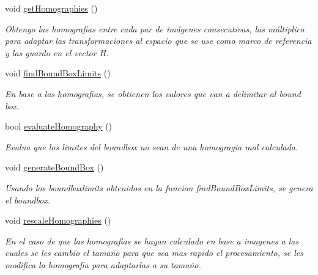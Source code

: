 \begin{DoxyCompactItemize}
\mbox{\label{classuav_1_1Stitcher_a9dde85d6912b1868a2da36abf84184a9}} 
void \mbox{\hyperlink{classuav_1_1Stitcher_a9dde85d6912b1868a2da36abf84184a9}{get\+Homographies}} ()
\begin{DoxyCompactList}\small\item\em Obtengo las homografias entre cada par de imágenes consecutivas, las múltiplico para adaptar las transformaciones al espacio que se use como marco de referencia y las guardo en el vector H. \end{DoxyCompactList}\item 
\mbox{\label{classuav_1_1Stitcher_a9a1b51dde72c48576b5d5ced0edc087b}} 
void \mbox{\hyperlink{classuav_1_1Stitcher_a9a1b51dde72c48576b5d5ced0edc087b}{find\+Bound\+Box\+Limits}} ()
\begin{DoxyCompactList}\small\item\em En base a las homografias, se obtienen los valores que van a delimitar al bound box. \end{DoxyCompactList}\item 
bool \mbox{\hyperlink{classuav_1_1Stitcher_a90039daf32275b9b9a4d7820e7a6a929}{evaluate\+Homography}} ()
\begin{DoxyCompactList}\small\item\em Evalua que los limites del boundbox no sean de una homogragia mal calculada. \end{DoxyCompactList}\item 
\mbox{\label{classuav_1_1Stitcher_a47deddeee449c53103b85082be7171df}} 
void \mbox{\hyperlink{classuav_1_1Stitcher_a47deddeee449c53103b85082be7171df}{generate\+Bound\+Box}} ()
\begin{DoxyCompactList}\small\item\em Usando los boundboxlimits obtenidos en la funcion find\+Bound\+Box\+Limits, se genera el boundbox. \end{DoxyCompactList}\item 
\mbox{\label{classuav_1_1Stitcher_a26bf84ee9e54a9f2f4c9d640554d7067}} 
void \mbox{\hyperlink{classuav_1_1Stitcher_a26bf84ee9e54a9f2f4c9d640554d7067}{rescale\+Homographies}} ()
\begin{DoxyCompactList}\small\item\em En el caso de que las homografias se hayan calculado en base a imagenes a las cuales se les cambio el tamaño para que sea mas rapido el procesamiento, se les modifica la homografia para adaptarlas a su tamaño. \end{DoxyCompactList}\item 

\end{DoxyCompactItemize}
